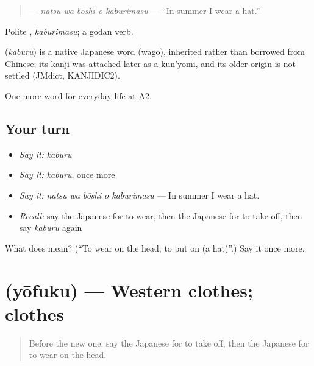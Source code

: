 \begin{quote}
\textbf{  } — \emph{natsu wa bōshi o kaburimasu} — \textquotedblleft{}In summer I wear a hat.\textquotedblright{}
\end{quote}

Polite \textbf{}, \emph{kaburimasu}; a godan verb.

\begin{cousinweb}
\textbf{} (\emph{kaburu}) is a native Japanese word (wago), inherited rather than borrowed from Chinese; its kanji was attached later as a kun'yomi, and its older origin is not settled (JMdict, KANJIDIC2).
\end{cousinweb}

\begin{grammarlens}[title={What you've built}]
One more word for everyday life at A2.
\end{grammarlens}

\subsection*{Your turn}
\begin{itemize}
\raggedright
  \item \emph{Say it:} \emph{kaburu}
  \item \emph{Say it:} \emph{kaburu}, once more
  \item \emph{Say it:} \emph{natsu wa bōshi o kaburimasu} — In summer I wear a hat.
  \item \emph{Recall:} say the Japanese for to wear, then the Japanese for to take off, then say \emph{kaburu} again
\end{itemize}

\begin{tcolorbox}[breakable,colback=teal!4,colframe=teal!35!black,title={Before you move on}]
What does  mean? (\textquotedblleft{}To wear on the head; to put on (a hat)\textquotedblright{}.) Say it once more.
\end{tcolorbox}
\section[\texorpdfstring{\ja{ようふく} (yōfuku)}{ようふく (yōfuku)}]{ (yōfuku) — Western clothes; clothes}

\label{lesson:JA-C149-youfuku}



\begin{quote}
Before the new one: say the Japanese for to take off, then the Japanese for to wear on the head.
\end{quote}


